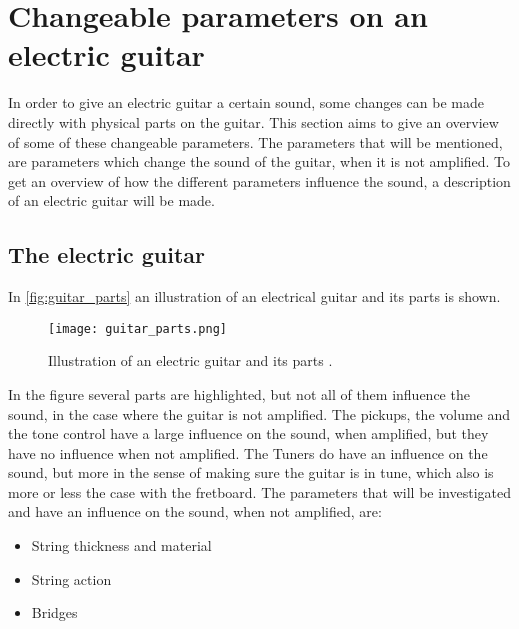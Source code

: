 \section{Changeable parameters on an electric guitar}

In order to give an electric guitar a certain sound, some changes can be made directly with physical parts on the guitar. This section aims to give an overview of some of these changeable parameters. The parameters that will be mentioned, are parameters which change the sound of the guitar, when it is not amplified.
To get an overview of how the different parameters influence the sound, a description of an electric guitar will be made.

\subsection{The electric guitar}

In \autoref{fig:guitar_parts} an illustration of an electrical guitar and its parts is shown.

\begin{figure}[h]
	\centering
		\texttt{[image: guitar\_parts.png]}
		\caption{Illustration of an electric guitar and its parts \cite{coustii}.}
		\label{fig:guitar_parts}
\end{figure}

In the figure several parts are highlighted, but not all of them influence the sound, in the case where the guitar is not amplified. The pickups, the volume and the tone control have a large influence on the sound, when amplified, but they have no influence when not amplified. The Tuners do have an influence on the sound, but more in the sense of making sure the guitar is in tune, which also is more or less the case with the fretboard. 
The parameters that will be investigated and have an influence on the sound, when not amplified, are:

\begin{itemize}
 \item String thickness and material
 \item String action
 \item Bridges
\end{itemize}

